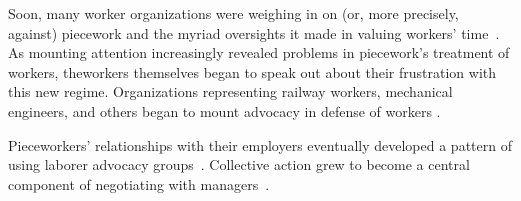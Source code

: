 \documentclass[trackingWork]{subfiles}
\begin{document}
Soon, many worker organizations were weighing in on (or, more precisely, against) piecework and the myriad oversights it made in valuing workers' time~\cite{american1921problem,richards1904anything}.
As mounting attention increasingly revealed problems in piecework's treatment of workers, theworkers themselves began to speak out about their frustration with this new regime.
Organizations representing railway workers, mechanical engineers, and others began to mount advocacy in defense of workers
\cite{american1921problem,richards1904anything}.



Pieceworkers' relationships with their employers eventually developed a pattern of using 
laborer advocacy groups~\cite{levi2009union,ahlquist2013interest,
      mccallum2013global,jacoby1983union}.
Collective action grew to become a central component of negotiating with managers~\cite{russell1982collective,olsonlogic}.
\end{document}
